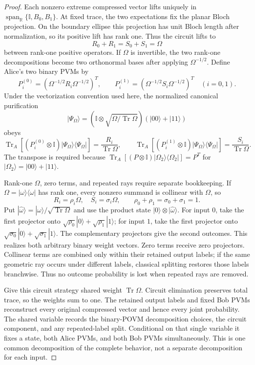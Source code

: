\documentclass[11pt]{article}
\theoremstyle{definition}
\newcommand{\Tr}{\operatorname{Tr}}
\newcommand{\id}{\mathbb I}
\newcommand{\R}{\mathbb R}
\begin{document}
\begin{proof}
Each nonzero extreme compressed vector lifts uniquely in
\(\operatorname{span}_{\R}\{\id,B_0,B_1\}\). At fixed trace, the two
expectations fix the planar Bloch projection. On the boundary ellipse this
projection has unit Bloch length after normalization, so its positive lift
has rank one. Thus the circuit lifts to
\[
R_0+R_1=S_0+S_1=\Omega
\]
between rank-one positive operators. If \(\Omega\) is invertible, the two
rank-one decompositions become two orthonormal bases after applying
\(\Omega^{-1/2}\). Define Alice's two binary PVMs by
\[
P_i^{(0)}=
\left(\Omega^{-1/2}R_i\Omega^{-1/2}\right)^T,\qquad
P_i^{(1)}=
\left(\Omega^{-1/2}S_i\Omega^{-1/2}\right)^T
\quad(i=0,1).
\]
Under the vectorization convention used here, the normalized canonical
purification
\[
|\Psi_\Omega\rangle=
(\id\otimes\sqrt{\Omega/\Tr\Omega})(|00\rangle+|11\rangle)
\]
obeys
\[
\Tr_A\!\left[(P_i^{(0)}\otimes\id)
|\Psi_\Omega\rangle\langle\Psi_\Omega|\right]
=\frac{R_i}{\Tr\Omega},\qquad
\Tr_A\!\left[(P_i^{(1)}\otimes\id)
|\Psi_\Omega\rangle\langle\Psi_\Omega|\right]
=\frac{S_i}{\Tr\Omega}.
\]
The transpose is required because
\(\Tr_A[(P\otimes\id)|\Omega_2\rangle\langle\Omega_2|]=P^T\) for
\(|\Omega_2\rangle=|00\rangle+|11\rangle\).

Rank-one \(\Omega\), zero terms, and repeated rays require separate
bookkeeping. If
\(\Omega=|\omega\rangle\langle\omega|\) has rank one, every nonzero summand
is collinear with \(\Omega\), so
\[
R_i=\rho_i\Omega,\quad S_i=\sigma_i\Omega,\qquad
\rho_0+\rho_1=\sigma_0+\sigma_1=1.
\]
Put \(|\widehat\omega\rangle=|\omega\rangle/\sqrt{\Tr\Omega}\) and use the
product state \(|0\rangle\otimes|\widehat\omega\rangle\). For input \(0\),
take the first projector onto
\(\sqrt{\rho_0}|0\rangle+\sqrt{\rho_1}|1\rangle\); for input \(1\), take the
first projector onto
\(\sqrt{\sigma_0}|0\rangle+\sqrt{\sigma_1}|1\rangle\). The complementary
projectors give the second outcomes. This realizes both arbitrary binary
weight vectors. Zero terms
receive zero projectors. Collinear terms are combined only within their
retained output labels; if the same geometric ray occurs under different
labels, classical splitting restores those labels branchwise. Thus no
outcome probability is lost when repeated rays are removed.

Give this circuit strategy shared weight \(\Tr\Omega\). Circuit elimination
preserves total trace, so the weights sum to one. The retained output labels
and fixed Bob PVMs reconstruct every original compressed vector and hence
every joint probability. The shared variable records the binary-POVM
decomposition choices, the circuit component, and any repeated-label split.
Conditional on that single variable it fixes a state, both Alice PVMs, and
both Bob PVMs simultaneously. This is one common decomposition of the
complete behavior, not a separate decomposition for each input.
\end{proof}
\end{document}
